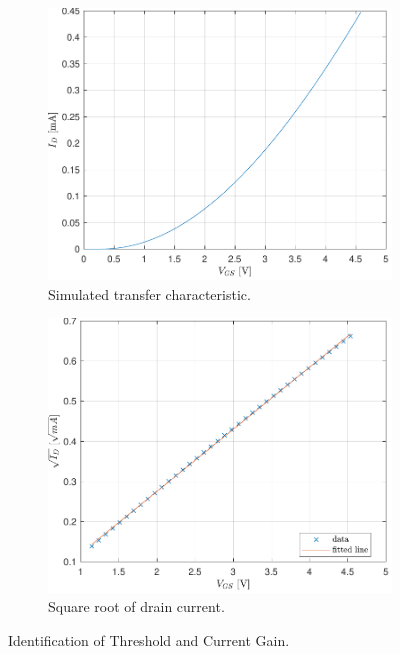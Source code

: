 \documentclass[11pt,a4paper]{article}
\begin{document}
	\begin{figure}
		\centering
		\begin{subfigure}[b]{0.45\textwidth}
			\centering
			\includegraphics[width=\textwidth]{parabola}
			\caption{Simulated transfer characteristic.}
			\label{parabola}
		\end{subfigure}
		\hfill
		\begin{subfigure}[b]{0.45\textwidth}
			\centering
			\includegraphics[width=\textwidth]{sqrt_fit}
			\caption{Square root of drain current.}
			\label{sqrt_fit}
		\end{subfigure}
		\caption{Identification of Threshold and Current Gain.}
		\label{identification}
	\end{figure}
\end{document}
